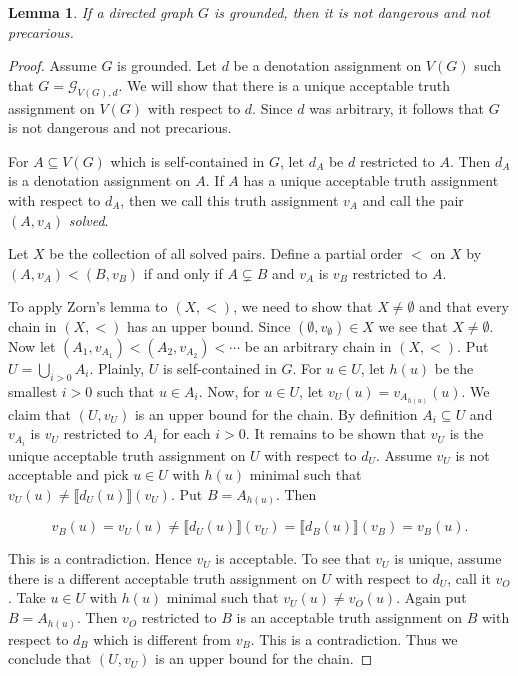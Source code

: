 \documentclass[12pt]{kluwer}
\newtheorem{lem}[thm]{Lemma}
\theoremstyle{remark}
\newcommand{\fancy}[1]{\mathcal{#1}}
\def\G{\fancy{G}}
\begin{document}
\begin{lem}\label{GroundedNotDangerous}
If a directed graph $G$ is grounded, then it is not dangerous and not precarious.
\end{lem}
\begin{proof}
Assume $G$ is grounded.  Let $d$ be a denotation assignment on $V(G)$ such that $G = \G_{V(G), d}$. We will show that there is a unique acceptable truth assignment on $V(G)$ with respect to $d$.  Since $d$ was arbitrary, it follows that $G$ is not dangerous and not precarious.

For $A \subseteq V(G)$ which is self-contained in $G$, let $d_A$ be $d$ restricted to $A$.  Then $d_A$ is a denotation assignment on $A$.  If $A$ has a unique acceptable truth assignment with respect to $d_A$, then we call this truth assignment $v_A$ and call the pair $(A, v_A)$ \emph{solved}.

Let $X$ be the collection of all solved pairs.  Define a partial order $<$ on $X$ by $(A, v_A) < (B, v_B)$ if and only if $A \subsetneq B$ and $v_A$ is $v_B$ restricted to $A$.

To apply Zorn's lemma to $(X, <)$, we need to show that $X \neq \emptyset$ and that every chain in  $(X, <)$ has an upper bound. Since $(\emptyset, v_\emptyset) \in X$ we see that $X \neq \emptyset$.  Now let $(A_1, v_{A_1}) < (A_2, v_{A_2}) < \cdots$ be an arbitrary chain in $(X, <)$.  Put $U = \bigcup_{i > 0} A_i$. Plainly, $U$ is self-contained in $G$. For $u \in U$, let $h(u)$ be the smallest $i > 0$ such that $u \in A_i$.  Now, for $u \in U$, let $v_U(u) = v_{A_{h(u)}}(u)$.  We claim that $(U, v_U)$ is an upper bound for the chain.  By definition $A_i \subseteq U$ and $v_{A_i}$ is $v_U$ restricted to $A_i$ for each $i > 0$.  It remains to be shown that $v_U$ is the unique acceptable truth assignment on $U$ with respect to $d_U$.  Assume $v_U$ is not acceptable and pick $u \in U$ with $h(u)$ minimal such that $v_U(u) \neq \llbracket d_U(u)\rrbracket(v_U)$.  Put $B = A_{h(u)}$. Then

\[v_B(u) = v_U(u) \neq \llbracket d_U(u)\rrbracket(v_U) = \llbracket d_B(u)\rrbracket(v_B) = v_B(u).\]

This is a contradiction.  Hence $v_U$ is acceptable.  To see that $v_U$ is unique, assume there is a different acceptable truth assignment on $U$ with respect to $d_U$, call it $v_O$.  Take $u \in U$ with $h(u)$ minimal such that $v_U(u) \neq v_O(u)$.  Again put $B = A_{h(u)}$.  Then $v_O$ restricted to $B$ is an acceptable truth assignment on $B$ with respect to $d_B$ which is different from $v_B$.  This is a contradiction.  Thus we conclude that $(U, v_U)$ is an upper bound for the chain.


\end{proof}
\end{document}
